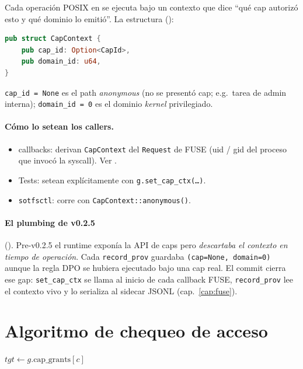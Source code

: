 Cada operación POSIX en  se ejecuta bajo un
contexto que dice ``qué cap autorizó esto y qué dominio lo emitió''.
La estructura ():

\begin{lstlisting}[language=rust]
pub struct CapContext {
    pub cap_id: Option<CapId>,
    pub domain_id: u64,
}
\end{lstlisting}

\texttt{cap\_id = None} es el path \emph{anonymous} (no se presentó cap;
e.g.\ tarea de admin interna); \texttt{domain\_id = 0} es el dominio
\emph{kernel} privilegiado.

\paragraph{Cómo lo setean los callers.}

\begin{itemize}
  \item \fuse{} callbacks: derivan \texttt{CapContext} del \texttt{Request}
    de FUSE (uid / gid del proceso que invocó la syscall). Ver
    .
  \item Tests: setean explícitamente con \texttt{g.set\_cap\_ctx(\dots)}.
  \item \texttt{sotfsctl}: corre con \texttt{CapContext::anonymous()}.
\end{itemize}

\paragraph{El plumbing de v0.2.5} (). Pre-v0.2.5 el
runtime exponía la API de caps pero \emph{descartaba el contexto en
tiempo de operación}. Cada \texttt{record\_prov} guardaba
\texttt{(cap=None, domain=0)} aunque la regla DPO se hubiera
ejecutado bajo una cap real. El commit cierra ese gap:
\texttt{set\_cap\_ctx} se llama al inicio de cada callback FUSE,
\texttt{record\_prov} lee el contexto vivo y lo serializa al sidecar
JSONL (cap.~\ref{cap:fuse}).

\section{Algoritmo de chequeo de acceso}

\begin{algorithm}[H]
\SetAlgoLined
{}
\caption{\textsc{CheckAccess}}\label{alg:check-access}

$\mathit{tgt} \gets g.\mathrm{cap\_grants}[c]$\;
\;
\end{algorithm}

